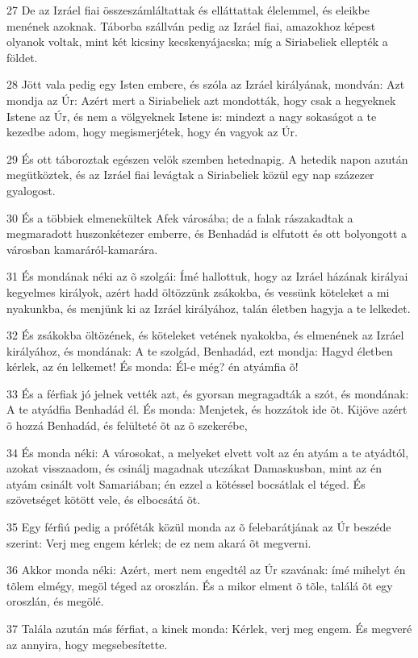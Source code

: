 \par 27 De az Izráel fiai összeszámláltattak és elláttattak élelemmel, és eleikbe menének azoknak. Táborba szállván pedig az Izráel fiai, amazokhoz képest olyanok voltak, mint két kicsiny kecskenyájacska; míg a Siriabeliek  ellepték a földet.
\par 28 Jött vala pedig egy Isten embere, és szóla az Izráel királyának, mondván: Azt mondja az Úr: Azért mert a Siriabeliek azt mondották, hogy csak a hegyeknek Istene az Úr, és nem a völgyeknek Istene is: mindezt a nagy sokaságot a te kezedbe adom, hogy megismerjétek, hogy én vagyok az Úr.
\par 29 És ott táboroztak egészen velök szemben hetednapig. A hetedik napon azután megütköztek, és az Izráel fiai levágtak a Siriabeliek közül egy nap százezer gyalogost.
\par 30 És a többiek elmenekültek Afek városába; de a falak rászakadtak a megmaradott huszonkétezer emberre, és Benhadád is elfutott és ott bolyongott a városban kamaráról-kamarára.
\par 31 És mondának néki az õ szolgái: Ímé hallottuk, hogy az Izráel házának királyai kegyelmes királyok, azért hadd öltözzünk zsákokba, és vessünk köteleket a mi nyakunkba, és menjünk ki az Izráel királyához, talán életben hagyja a te lelkedet.
\par 32 És zsákokba öltözének, és köteleket vetének nyakokba, és elmenének az Izráel királyához, és mondának: A te szolgád, Benhadád, ezt mondja: Hagyd életben kérlek, az én lelkemet! És monda: Él-e még? én atyámfia õ!
\par 33 És a férfiak jó jelnek vették azt, és gyorsan megragadták a szót, és mondának: A te atyádfia Benhadád él. És monda: Menjetek, és hozzátok ide õt. Kijöve azért õ hozzá Benhadád, és felülteté õt az õ szekerébe,
\par 34 És monda néki: A városokat, a melyeket elvett volt az én atyám a te atyádtól, azokat visszaadom, és csinálj magadnak utczákat Damaskusban, mint az én atyám csinált volt Samariában; én ezzel a kötéssel bocsátlak el téged. És szövetséget kötött vele, és elbocsátá õt.
\par 35 Egy férfiú pedig a próféták közül monda az õ felebarátjának az Úr beszéde szerint: Verj meg engem kérlek; de ez nem akará õt megverni.
\par 36 Akkor monda néki: Azért, mert nem engedtél az Úr szavának: ímé mihelyt én tõlem elmégy, megöl téged az oroszlán. És a mikor elment õ tõle, találá õt egy oroszlán, és megölé.
\par 37 Talála azután más férfiat, a kinek monda: Kérlek, verj meg engem. És megveré az annyira, hogy megsebesítette.
